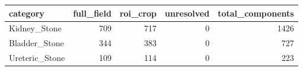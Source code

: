 \begin{tabular}{lrrrr}
\toprule
category & full_field & roi_crop & unresolved & total_components \\
\midrule
Kidney_Stone & 709 & 717 & 0 & 1426 \\
Bladder_Stone & 344 & 383 & 0 & 727 \\
Ureteric_Stone & 109 & 114 & 0 & 223 \\
\bottomrule
\end{tabular}
